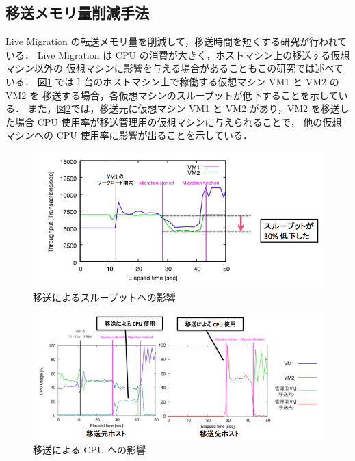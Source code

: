 \documentclass[graduation-thesis]{mlarticle}
\begin{document}
\subsection{移送メモリ量削減手法}
\label{sec-3-2}
Live Migration の転送メモリ量を削減して，移送時間を短くする研究\cite{Koto:2012:TUV}が行われている．
Live Migration は CPU の消費が大きく，ホストマシン上の移送する仮想マシン以外の
仮想マシンに影響を与える場合があることもこの研究では述べている．
図\ref{migrate-noise} では１台のホストマシン上で稼働する仮想マシン VM1 と VM2 の VM2 を
移送する場合，各仮想マシンのスループットが低下することを示している．
また，図\ref{migrate-noise-cpu}では，移送元に仮想マシン VM1 と VM2 があり，VM2 を移送した場合
CPU 使用率が移送管理用の仮想マシンに与えられることで，
他の仮想マシンへの CPU 使用率に影響が出ることを示している．
\begin{figure}[H]\begin{center}\includegraphics[width=12.0cm]{./img/migrate-noise.png}\caption{ 移送によるスループットへの影響}\label{migrate-noise}\end{center}\end{figure}
\begin{figure}[H]\begin{center}\includegraphics[width=12.0cm]{./img/migrate-noise-cpu.png}\caption{ 移送による CPU への影響}\label{migrate-noise-cpu}\end{center}\end{figure}
\end{document}
